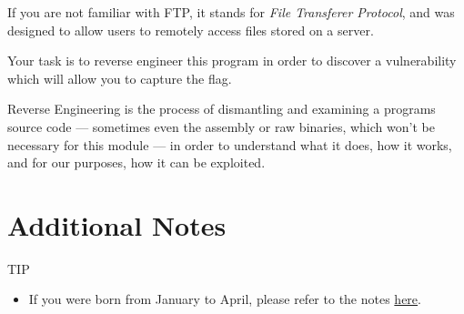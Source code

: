 {{{                    If you are not familiar with FTP, it stands for \textit{File Transferer Protocol}, and was designed to allow users to remotely access files stored on a server. 















                    Your task is to reverse engineer this program in order to discover a vulnerability which will allow you to capture the flag.















                    Reverse Engineering is the process of dismantling and examining a programs source code — sometimes even the assembly or raw binaries, which won't be necessary for this module — in order to understand what it does, how it works, and for our purposes, how it can be exploited.







                \section*{Additional Notes}







                    TIP







                    \begin{itemize}







                        \item If you were born from January to April, please refer to the notes \href{https://github.com/brendonky18/Honors-Thesis.CTFs/blob/main/going-backwards/notes_0.md}{here}.








\end{itemize}}}}

